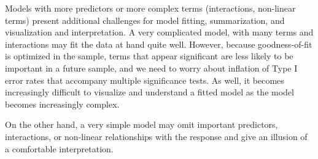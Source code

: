 \documentclass[11pt]{book}
\begin{document}
Models with more predictors or more complex terms (interactions, non-linear terms)
present additional challenges for model fitting, summarization,
and visualization and interpretation.
A very complicated model, with many terms and interactions may fit the data at hand
quite well. However, because goodness-of-fit is optimized in the sample, 
terms that appear significant are less likely to be important in a future sample,
and we need to worry about inflation of Type I error rates that accompany
multiple significance tests.  As well, it becomes increasingly difficult to
visualize and understand a fitted model as the model becomes increasingly complex.

On the other hand, a very simple model may omit important predictors, interactions, or
non-linear relationships with the response and give an illusion of a comfortable
interpretation.  

\end{document}
